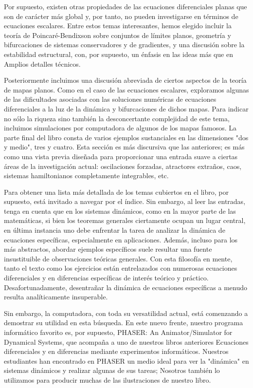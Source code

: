 \documentclass[]{article}
\begin{document}
\hfill

Por supuesto, existen otras propiedades de las ecuaciones diferenciales planas que son de carácter más global y, por tanto, no pueden investigarse en términos de ecuaciones escalares. Entre estos temas interesantes, hemos elegido incluir la teoría de Poincaré-Bendixson sobre conjuntos de límites planos, geometría y bifurcaciones de sistemas conservadores y de gradientes, y una discusión sobre la estabilidad estructural, con, por supuesto, un énfasis en las ideas más que en Amplios detalles técnicos.

\hfill

Posteriormente incluimos una discusión abreviada de ciertos aspectos de la teoría de mapas planos. Como en el caso de las ecuaciones escalares, exploramos algunas de las dificultades asociadas con las soluciones numéricas de ecuaciones diferenciales a la luz de la dinámica y bifurcaciones de dichos mapas. Para indicar no sólo la riqueza sino también la desconcertante complejidad de este tema, incluimos simulaciones por computadora de algunos de los mapas famosos. La parte final del libro consta de varios ejemplos sustanciales en las dimensiones "dos y medio", tres y cuatro. Esta sección es más discursiva que las anteriores; es más como una vista previa diseñada para proporcionar una entrada suave a ciertas áreas de la investigación actual: oscilaciones forzadas, atractores extraños, caos, sistemas hamiltonianos completamente integrables, etc.

\hfill

Para obtener una lista más detallada de los temas cubiertos en el libro, por supuesto, está invitado a navegar por el índice. Sin embargo, al leer las entradas, tenga en cuenta que en los sistemas dinámicos, como en la mayor parte de las matemáticas, si bien los teoremas generales ciertamente ocupan un lugar central, en última instancia uno debe enfrentar la tarea de analizar la dinámica de ecuaciones específicas, especialmente en aplicaciones. Además, incluso para los más abstractos, abordar ejemplos específicos suele resultar una fuente insustituible de observaciones teóricas generales. Con esta filosofía en mente, tanto el texto como los ejercicios están entrelazados con numerosas ecuaciones diferenciales y en diferencias específicas de interés teórico y práctico. Desafortunadamente, desentrañar la dinámica de ecuaciones específicas a menudo resulta analíticamente insuperable.

\hfill

Sin embargo, la computadora, con toda su versatilidad actual, está comenzando a demostrar su utilidad en esta búsqueda. En este nuevo frente, nuestro programa informático favorito es, por supuesto, PHASER: An Animator/Simulator for Dynamical Systems, que acompaña a uno de nuestros libros anteriores Ecuaciones diferenciales y en diferencias mediante experimentos informáticos. Nuestros estudiantes han encontrado en PHASER un medio ideal para ver la "dinámica" en sistemas dinámicos y realizar algunas de sus tareas; Nosotros también lo utilizamos para producir muchas de las ilustraciones de nuestro libro.
\end{document}
